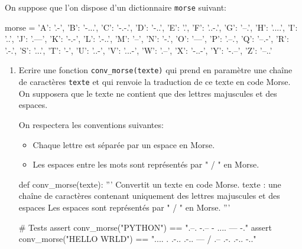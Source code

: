 \documentclass[11pt, a4paper]{report}
\def\ptsexoE{2}
\begin{document}
\exods{\ptsexoE}{\quad}

On suppose que l'on dispose d'un dictionnaire \verb|morse| suivant:

\begin{CodePythontexAlt}[TaillePolice=\large, Largeur=1\linewidth,Centre,Lignes=true,PremLigne=1]{}
morse = {'A': '.-', 'B': '-...', 'C': '-.-.', 'D': '-..', 'E': '.', 'F': '..-.',
         'G': '--.', 'H': '....', 'I': '..', 'J': '.---', 'K': '-.-', 
         'L': '.-..', 'M': '--', 'N': '-.', 'O': '---', 'P': '.--.', 
         'Q': '--.-', 'R': '.-.', 'S': '...', 'T': '-', 'U': '..-',
         'V': '...-', 'W': '.--', 'X': '-..-', 'Y': '-.--', 'Z': '--..'}

\end{CodePythontexAlt}


\begin{enumerate}
    \item Ecrire une fonction \verb|conv_morse(texte)| qui prend en paramètre une chaîne de caractères \verb|texte| et qui renvoie la traduction de ce texte en code Morse. On supposera que le texte ne contient que des lettres majuscules et des espaces.
    
    On respectera les conventions suivantes:
    \begin{itemize}
        \item Chaque lettre est séparée par un espace en Morse.
        \item Les espaces entre les mots sont représentés par " / " en Morse.
    \end{itemize}
    \begin{CodePythontexAlt}[TaillePolice=\large, Largeur=1\linewidth,Centre,Lignes=true,PremLigne=1]{}
def conv_morse(texte):
    ''' Convertit un texte en code Morse.
    texte : une chaîne de caractères contenant uniquement des lettres 
    majuscules et des espaces
    Les espaces sont représentés par " / " en Morse.
    '''
    
    

    








    # Tests
assert conv_morse("PYTHON") == ".--. -.-- - .... --- -."
assert conv_morse("HELLO WRLD") == ".... . .-.. .-.. --- / .-- .-. .-.. -.."
    
    \end{CodePythontexAlt}
\end{enumerate}
\end{document}

